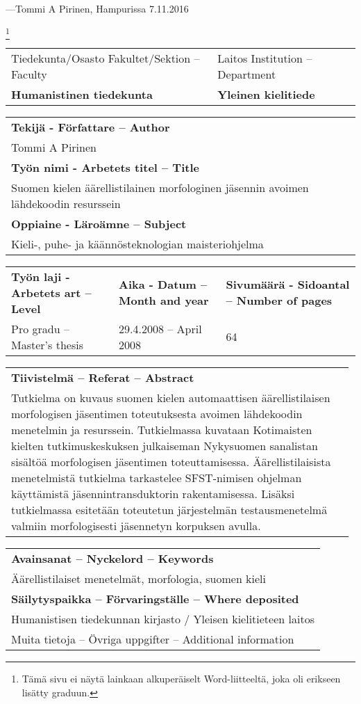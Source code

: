 \documentclass[free]{flammie}
\begin{document}
---Tommi A Pirinen, Hampurissa 7.11.2016


\newpage

\footnote{Tämä sivu ei näytä lainkaan alkuperäiselt Word-liitteeltä, joka oli
erikseen lisätty graduun.}

\begin{tabular}{|l|l|}
\hline
Tiedekunta/Osasto Fakultet/Sektion – Faculty &
Laitos Institution – Department \\
\bf Humanistinen tiedekunta & \bf Yleinen kielitiede \\
\hline
\end{tabular}
\begin{tabular}{|l|}
\hline
\bf Tekijä - Författare – Author \\
Tommi A Pirinen \\
\hline
\bf Työn nimi - Arbetets titel – Title \\
Suomen kielen äärellistilainen morfologinen jäsennin avoimen lähdekoodin
resurssein \\
\hline
\bf Oppiaine - Läroämne – Subject \\
Kieli-, puhe- ja käännösteknologian maisteriohjelma \\
\hline
\end{tabular}
\begin{tabular}{|l|l|l|}
    \hline
    \bf Työn laji - Arbetets art – Level &
    \bf Aika - Datum – Month and year &
    \bf Sivumäärä - Sidoantal – Number of pages \\
    Pro gradu – Master’s thesis &
    29.4.2008 – April 2008 &
    64 \\
    \hline
\end{tabular}
\begin{tabular}{|p{0.98\linewidth}|}
    \hline
    \bf Tiivistelmä – Referat – Abstract \\
    Tutkielma on kuvaus suomen kielen automaattisen äärellistilaisen morfologisen
    jäsentimen toteutuksesta avoimen lähdekoodin menetelmin ja resurssein.
    Tutkielmassa kuvataan Kotimaisten kielten tutkimuskeskuksen julkaiseman
    Nykysuomen sanalistan sisältöä morfologisen jäsentimen toteuttamisessa.
    Äärellistilaisista menetelmistä tutkielma tarkastelee SFST-nimisen ohjelman
    käyttämistä jäsennintransduktorin rakentamisessa. Lisäksi tutkielmassa
    esitetään toteutetun järjestelmän testausmenetelmä valmiin morfologisesti
    jäsennetyn korpuksen avulla. \\
    \hline
\end{tabular}
\begin{tabular}{|l|}
    \hline
    \bf Avainsanat – Nyckelord – Keywords \\
    Äärellistilaiset menetelmät, morfologia, suomen kieli \\
    \hline
    \bf Säilytyspaikka – Förvaringställe – Where deposited \\
    Humanistisen tiedekunnan kirjasto / Yleisen kielitieteen laitos \\
    \hline
    Muita tietoja – Övriga uppgifter – Additional information \\
    \hline
\end{tabular}
\end{document}
